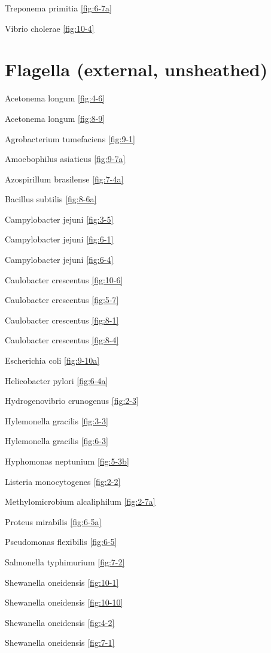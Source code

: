 \documentclass[]{tufte-book}
\begin{document}
Treponema primitia \ref{fig:6-7a}

Vibrio cholerae \ref{fig:10-4}

\section{\texorpdfstring{\textbf{Flagella (external,
unsheathed)}}{Flagella (external, unsheathed)}}\label{flagella-external-unsheathed}

Acetonema longum \ref{fig:4-6}

Acetonema longum \ref{fig:8-9}

Agrobacterium tumefaciens \ref{fig:9-1}

Amoebophilus asiaticus \ref{fig:9-7a}

Azospirillum brasilense \ref{fig:7-4a}

Bacillus subtilis \ref{fig:8-6a}

Campylobacter jejuni \ref{fig:3-5}

Campylobacter jejuni \ref{fig:6-1}

Campylobacter jejuni \ref{fig:6-4}

Caulobacter crescentus \ref{fig:10-6}

Caulobacter crescentus \ref{fig:5-7}

Caulobacter crescentus \ref{fig:8-1}

Caulobacter crescentus \ref{fig:8-4}

Escherichia coli \ref{fig:9-10a}

Helicobacter pylori \ref{fig:6-4a}

Hydrogenovibrio crunogenus \ref{fig:2-3}

Hylemonella gracilis \ref{fig:3-3}

Hylemonella gracilis \ref{fig:6-3}

Hyphomonas neptunium \ref{fig:5-3b}

Listeria monocytogenes \ref{fig:2-2}

Methylomicrobium alcaliphilum \ref{fig:2-7a}

Proteus mirabilis \ref{fig:6-5a}

Pseudomonas flexibilis \ref{fig:6-5}

Salmonella typhimurium \ref{fig:7-2}

Shewanella oneidensis \ref{fig:10-1}

Shewanella oneidensis \ref{fig:10-10}

Shewanella oneidensis \ref{fig:4-2}

Shewanella oneidensis \ref{fig:7-1}
\end{document}
